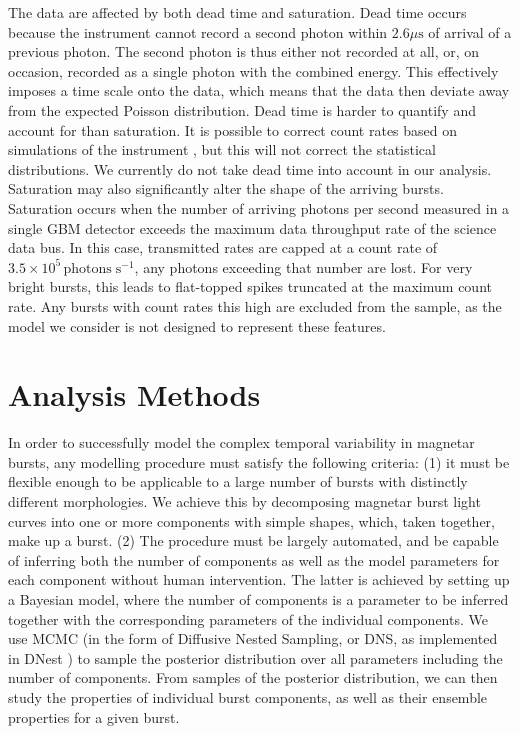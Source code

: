 \documentclass[12pt]{emulateapj}
\begin{document}
The data are affected by both dead time and saturation. 
Dead time occurs because the instrument cannot record a second photon within $2.6\mu\mathrm{s}$ of arrival of a previous photon. 
The second photon is thus either not recorded at all, or, on occasion, recorded as a single photon with the combined energy. This effectively 
imposes a time scale onto the data, which means that the data then deviate away from the expected Poisson distribution. 
Dead time is harder to quantify and account for than saturation. It is possible to correct count rates based on simulations of the instrument \citep{meegan2009,briggs2010,chaplin2013},
but this will not correct the statistical distributions. We currently do not take dead time into account in our analysis.   Saturation may also significantly alter the shape of the arriving bursts. Saturation occurs when the number of arriving photons per second
measured in a single GBM detector exceeds the maximum data throughput rate of the science data bus. In this case, transmitted rates are capped at a 
count rate of $3.5 \times 10^{5} \, \mathrm{photons} \; \mathrm{s}^{-1}$, any photons exceeding that number are lost. For very bright bursts, this leads
to flat-topped spikes truncated at the maximum count rate. Any bursts with count rates this high are excluded from the sample, as the model we
consider is not designed to represent these features. 


\section{Analysis Methods}
\label{ch6:methods}
In order to successfully model the complex temporal variability in magnetar bursts, any modelling procedure must satisfy the following criteria: (1) it must be flexible enough to be applicable to a large number of bursts with distinctly different morphologies. We achieve this by decomposing magnetar burst light curves into one or more components with simple shapes, which, taken together, make up a burst. (2) The procedure must be largely automated, and be capable of inferring both the number of components as well as the model parameters for each component without human intervention. The latter is achieved by setting up a Bayesian model, where the number of components is a parameter to be inferred together with the corresponding parameters of the individual components. We use MCMC (in the form of Diffusive Nested Sampling, or DNS, as implemented in DNest \citep{brewer2011}) to sample the posterior distribution over all parameters including the number of components. From samples of the posterior distribution,
we can then study the properties of individual burst components, as well as their ensemble properties for a given burst.
\end{document}
